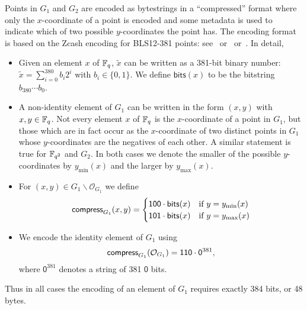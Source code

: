 
\newcommand{\ymin}{y_{\text{min}}}
\newcommand{\ymax}{y_{\text{max}}}

\label{note:group-compression}
Points in $G_1$ and $G_2$ are encoded as bytestrings in a ``compressed'' format
where only the $x$-coordinate of a point is encoded and some metadata is used to
indicate which of two possible $y$-coordinates the point has.  The encoding
format is based on the Zcash encoding for BLS12-381 points:
see~\cite{Zcash-serialisation} or~\cite[``Serialization'']{BLST-library}
or~\cite[Appendices C and D]{IETF-pairing-friendly-curves}.  In detail,

\begin{itemize}

\item Given an element $x$ of $\mathbb{F}_q$, $\tilde{x}$ can be written as a 381-bit
binary number: $\tilde{x} = \sum_{i=0}^{380}b_i2^i$ with $b_i \in \{0,1\}$.  We
define $\mathsf{bits}(x)$ to be the bitstring $b_{380}\cdots b_0$.

\item A non-identity element of $G_1$ can be written in the form $(x,y)$ with $x,y\in\mathbb{F}_q$.
Not every element $x$ of $\mathbb{F}_q$ is the $x$-coordinate of a point in $G_1$, but
those which are in fact occur as the $x$-coordinate of two distinct points in
$G_1$ whose $y$-coordinates are the negatives of each other.  A similar
statement is true for $\mathbb{F}_{q^2}$ and $G_2$.  In both cases we denote the smaller of
the possible $y$-coordinates by $\ymin(x)$ and the larger by $\ymax(x)$.

\item For $(x,y) \in G_1\backslash \mathcal{O}_{G_1}$ we define
$$
\compress_{G_1} (x,y) = \begin{cases}
\mathsf{1}\mathsf{0}\mathsf{0}\cdot\mathsf{bits}(x) & \text{if $y=\ymin(x)$}\\
\mathsf{1}\mathsf{0}\mathsf{1}\cdot\mathsf{bits}(x) & \text{if $y=\ymax(x)$}\\
\end{cases}
$$
\item We encode the identity element of $G_1$ using
$$
\mathsf{compress}_{G_1}(\mathcal{O}_{G_1}) = \mathsf{1}\mathsf{1}\mathsf{0}\cdot\mathsf{0}^{381},
$$
\noindent where $\mathsf{0}^{381}$ denotes a string of 381 $\mathsf{0}$ bits.
\end{itemize}
\noindent Thus in all cases the encoding of an element of $G_1$ requires exactly 384 bits,
or 48 bytes.

